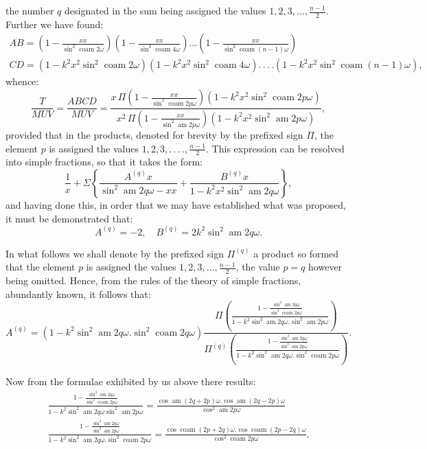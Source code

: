 \documentclass{article}
\begin{document}
the number $q$ designated in the sum being assigned the values $1,2,3,\ldots,\frac{n-1}{2}$. Further we have found:
\[
\begin{gathered}
AB=\left(1-\frac{xx}{\sin^{2}\operatorname{coam}2\omega}\right)\left(1-\frac{xx}{\sin^{2}\operatorname{coam}4\omega}\right)\ldots\left(1-\frac{xx}{\sin^{2}\operatorname{coam}(n-1)\omega}\right)\\[1.5ex]
CD=\left(1-k^{2}x^{2}\sin^{2}\operatorname{coam}2\omega\right)\left(1-k^{2}x^{2}\sin^{2}\operatorname{coam}4\omega\right).\,.\,.\,.\left(1-k^{2}x^{2}\sin^{2}\operatorname{coam}(n-1)\omega\right),
\end{gathered}
\]
whence:
\[
\frac{T}{MUV}=\frac{ABCD}{MUV}=\frac{x\,\Pi\left(1-\frac{xx}{\sin^{2}\operatorname{coam}2p\omega}\right)\left(1-k^{2}x^{2}\sin^{2}\operatorname{coam}2p\omega\right)}{x^{2}\,\Pi\left(1-\frac{xx}{\sin^{2}\operatorname{am}2p\omega}\right)\left(1-k^{2}x^{2}\sin^{2}\operatorname{am}2p\omega\right)},
\]
provided that in the products, denoted for brevity by the prefixed sign $\Pi$, the element $p$ is assigned the values $1,2,3,.\,.\,.\,.,\frac{n-1}{2}$. This expression can be resolved into simple fractions, so that it takes the form:
\[
\frac{1}{x}+\Sigma\left\{\frac{A^{(q)}x}{\sin^{2}\operatorname{am}2q\omega-xx}+\frac{B^{(q)}x}{1-k^{2}x^{2}\sin^{2}\operatorname{am}2q\omega}\right\},
\]
and having done this, in order that we may have established what was proposed, it must be demonstrated that:
\[
A^{(q)}=-2,\quad B^{(q)}=2k^{2}\sin^{2}\operatorname{am}2q\omega.
\]

In what follows we shall denote by the prefixed sign $\Pi^{(q)}$ a product so formed that the element $p$ is assigned the values $1,2,3,\ldots,\frac{n-1}{2}$, the value $p=q$ however being omitted. Hence, from the rules of the theory of simple fractions, abundantly known, it follows that:
\[
A^{(q)}=\left(1-k^{2}\sin^{2}\operatorname{am}2q\omega.\sin^{2}\operatorname{coam}2q\omega\right)\frac{\Pi\left(\frac{1-\frac{\sin^{2}\operatorname{am}2q\omega}{\sin^{2}\operatorname{coam}2p\omega}}{1-k^{2}\sin^{2}\operatorname{am}2q\omega.\sin^{2}\operatorname{am}2p\omega}\right)}{\Pi^{(q)}\left(\frac{1-\frac{\sin^{2}\operatorname{am}2q\omega}{\sin^{2}\operatorname{am}2p\omega}}{1-k^{2}\sin^{2}\operatorname{am}2q\omega.\sin^{2}\operatorname{coam}2p\omega}\right)}.
\]

Now from the formulae exhibited by us above there results:
\[
\begin{gathered}
\frac{1-\frac{\sin^{2}\operatorname{am}2q\omega}{\sin^{2}\operatorname{coam}2p\omega}}{1-k^{2}\sin^{2}\operatorname{am}2q\omega\sin^{2}\operatorname{am}2p\omega}=\frac{\cos\operatorname{am}(2q+2p)\omega.\cos\operatorname{am}(2q-2p)\omega}{\cos^{2}\operatorname{am}2p\omega}\\[1.5ex]
\frac{1-\frac{\sin^{2}\operatorname{am}2q\omega}{\sin^{2}\operatorname{am}2p\omega}}{1-k^{2}\sin^{2}\operatorname{am}2q\omega.\sin^{2}\operatorname{coam}2p\omega}=\frac{\cos\operatorname{coam}(2p+2q)\omega.\cos\operatorname{coam}(2p-2q)\omega}{\cos^{2}\operatorname{coam}2p\omega}.
\end{gathered}
\]
\end{document}
